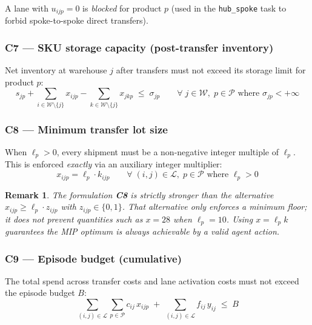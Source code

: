 \documentclass[11pt, a4paper]{article}
\newtheorem{remark}{Remark}
\begin{document}
A lane with $u_{ijp} = 0$ is \emph{blocked} for product $p$ (used in
the \texttt{hub\_spoke} task to forbid spoke-to-spoke direct transfers).

\subsubsection*{C7 — SKU storage capacity (post-transfer inventory)}

Net inventory at warehouse $j$ after transfers must not exceed its
storage limit for product $p$:
\begin{equation}
  s_{jp}
  + \sum_{i \in \mathcal{W} \setminus \{j\}} x_{ijp}
  - \sum_{k \in \mathcal{W} \setminus \{j\}} x_{jkp}
  \;\leq\; \sigma_{jp}
  \qquad \forall\; j \in \mathcal{W},\; p \in \mathcal{P}
  \text{ where } \sigma_{jp} < +\infty
  \tag{C7}
\end{equation}

\subsubsection*{C8 — Minimum transfer lot size}

When $\ell_p > 0$, every shipment must be a non-negative integer
multiple of $\ell_p$.  This is enforced \emph{exactly} via an auxiliary
integer multiplier:
\begin{equation}
  x_{ijp} = \ell_p \cdot k_{ijp}
  \qquad \forall\; (i,j) \in \mathcal{L},\; p \in \mathcal{P}
  \text{ where } \ell_p > 0
  \tag{C8}
\end{equation}

\begin{remark}
  The formulation \textbf{C8} is strictly stronger than the alternative
  $x_{ijp} \geq \ell_p \cdot z_{ijp}$ with $z_{ijp} \in \{0,1\}$.  That
  alternative only enforces a minimum \emph{floor}; it does not prevent
  quantities such as $x = 28$ when $\ell_p = 10$.  Using $x = \ell_p k$
  guarantees the MIP optimum is always achievable by a valid agent action.
\end{remark}

\subsubsection*{C9 — Episode budget (cumulative)}

The total spend across transfer costs and lane activation costs must not
exceed the episode budget $B$:
\begin{equation}
  \sum_{(i,j)\in\mathcal{L}}\sum_{p\in\mathcal{P}} c_{ij}\, x_{ijp}
  \;+\;
  \sum_{(i,j)\in\mathcal{L}} f_{ij}\, y_{ij}
  \;\leq\; B
  \tag{C9}
\end{equation}
\end{document}
